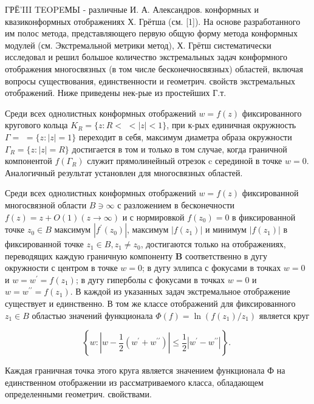 \documentclass[10pt]{article}
\begin{document}
ГРЁ'III TEOPEМЬI - различные И. А. Александров. конформных и квазиконформных отображениях Х. Грётша (см. [1]). На основе разработанного им полос метода, представляющего первую общую форму метода конформных модулей (см. Экстремальной метрики метод), Х. Грётш систематически исследовал и решил большое количество экстремальных задач конформного отображения многосвязных (в том числе бесконечносвязных) областей, включая вопросы существования, единственности и геометрич. свойств экстремальных отображений. Ниже приведены нек-рые из простейших Г.т.



Среди всех однолистных конформных отображений $w=f(z)$ фиксированного кругового кольца $K_{R}=\{z: R<$ $<|z|<1\}$, при к-рых единичная окружность $\Gamma=$ $=\{z:|z|=1\}$ переходит в себя, максимум диаметра образа окружности $\Gamma_{R}=\{z:|z|=R\}$ достигается в том и только в том случае, когда граничной компонентой $f\left(\Gamma_{R}\right)$ служит прямолинейный отрезок c серединой в точке $w=0$. Аналогичный результат установлен для многосвязных областей.



Среди всех однолистных конформных отображений $w=f(z)$ фиксированной многосвязной области $B \ni \infty$ с разложением в бесконечности $f(z)=z+O(1)(z \rightarrow \infty)$ и с нормировкой $f\left(z_{0}\right)=0$ в фиксированной точке $z_{0} \in B$ максимум $\left|f^{\prime}\left(z_{0}\right)\right|$, максимум $\left|f\left(z_{1}\right)\right|$ и минимум $\left|f\left(z_{1}\right)\right|$ в фиксированной точке $z_{1} \in B, z_{1} \neq z_{0}$, достигаются только на отображениях, переводящих каждую граничную компоненту $\boldsymbol{B}$ соответственно в дугу окружности с центром в точке $w=0$; в дугу эллипса с фокусами в точках $w=0$ и $w=w^{\prime}=f\left(z_{1}\right)$; в дугу гиперболы с фокусами в точках $w=0$ и $w=w^{\prime \prime}=f\left(z_{1}\right)$. В каждой из указанных задач экстремальное отображение существует и единственно. В том же классе отображений для фиксированного $z_{1} \in B$ областью значений функционала $\Phi(f)=\ln \left(f\left(z_{1}\right) / z_{1}\right)$ является круг



\[

\left\{w:\left|w-\frac{1}{2}\left(w^{\prime}+w^{\prime \prime}\right)\right| \leqslant \frac{1}{2}\left|w^{\prime}-w^{\prime \prime}\right|\right\} \text {. }

\]



Каждая граничная точка этого круга является значением функционала Ф на единственном отображении из рассматриваемого класса, обладающем определенными геометрич. свойствами.
\end{document}
